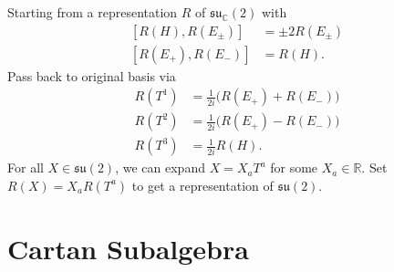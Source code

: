 Starting from a representation $R$ of $\mathfrak{su}_{\mathbb{C}}(2)$ with
\begin{subequations}
  \begin{align}
    \label{eq:15-star2}
    [R(H), R(E_{\pm})] &= \pm 2 R(E_\pm) \\
    [R(E_+), R(E_-)] &= R(H).
  \end{align}
\end{subequations}
Pass back to original basis via
\begin{subequations}
  \begin{align}
    R(T^1) &= \frac{1}{2i} \bigl(R(E_+) + R(E_-)\bigr) \\
    R(T^2) &= \frac{1}{2i} \bigl(R(E_+) - R(E_-)\bigr) \\
    R(T^3) &= \frac{1}{2i} R(H).
  \end{align}
\end{subequations}
For all $X \in \mathfrak{su}(2)$, we can expand $X = X_{a} T^{a}$ for some ${X_{a} \in \mathbb{R}}$. Set $R(X) = X_{a} R(T^{a})$ to get a representation of $\mathfrak{su}(2)$.


\section{Cartan Subalgebra}%
\label{sec:cartan_subalgebra}


